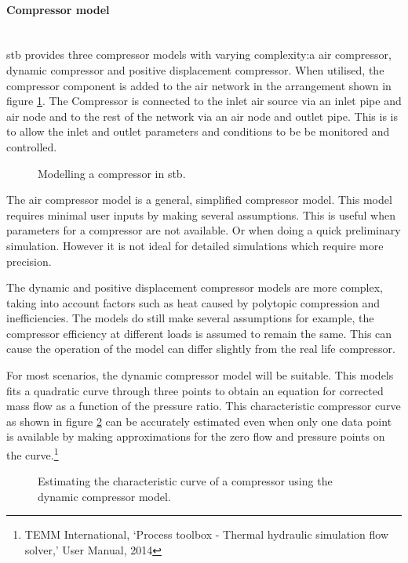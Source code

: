 		\paragraph{Compressor model}\leavevmode\\
		\gls{stb} provides three compressor models with varying complexity:a air compressor, dynamic compressor and positive displacement compressor. When utilised, the
		 compressor component is added to the air network in the arrangement shown in figure \ref{fig: Compressor models}. The Compressor is connected to the inlet air source via an inlet pipe and air node and to the rest of the network via an air node and outlet pipe. This is is to allow the inlet and outlet parameters and conditions to be be monitored and controlled.
		\begin{figure}[h]
			\centering
			\caption{Modelling a compressor in \gls{stb}.}
			\label{fig: Compressor models}
		\end{figure}
		\par
		 The air compressor model is a general, simplified compressor model. This model requires minimal user inputs by making several assumptions. This is useful when parameters for a compressor are not available. Or when doing a quick preliminary simulation. However it is not ideal for detailed simulations which require more precision.
		 \par 
		 The dynamic and positive displacement compressor models are more complex, taking into account factors such as heat caused by polytopic compression and inefficiencies. The models do still make several assumptions for example, the compressor efficiency at different loads is assumed to remain the same. This can cause the operation of the model can differ slightly from the real life compressor.
		 \par
		 For most scenarios, the dynamic compressor model will be suitable. This models fits a quadratic curve through three points to obtain an equation for corrected mass flow as a function of the pressure ratio. This characteristic compressor curve as shown in figure \ref{fig: Compressor Curve} can be accurately estimated even when only one data point is available by making approximations for the zero flow and pressure points on the curve.\footnote{TEMM International, \enquote*{Process toolbox - Thermal hydraulic simulation flow solver,} User Manual, 2014} 
			\begin{figure}[h]
				\centering
				\fbox{}
				\caption{Estimating the characteristic curve of a compressor using the dynamic compressor model.}
				\label{fig: Compressor Curve}
			\end{figure}
